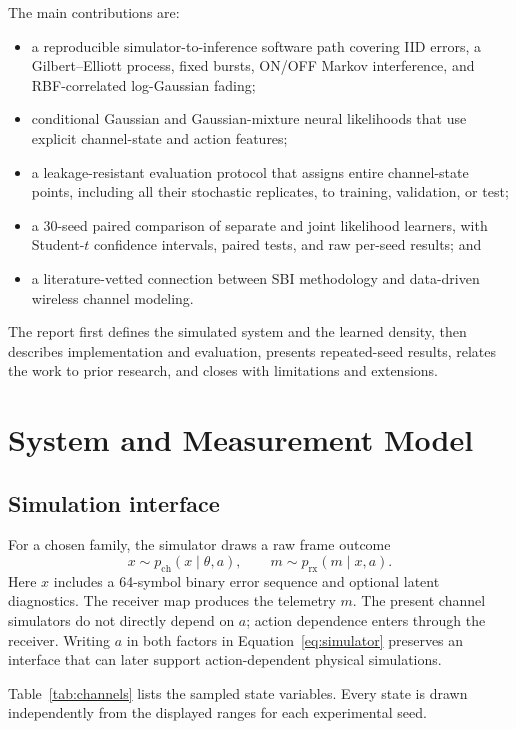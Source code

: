 \documentclass[10pt]{article}
\begin{document}
The main contributions are:
\begin{itemize}
  \item a reproducible simulator-to-inference software path covering IID errors, a Gilbert--Elliott process, fixed bursts, ON/OFF Markov interference, and RBF-correlated log-Gaussian fading;
  \item conditional Gaussian and Gaussian-mixture neural likelihoods that use explicit channel-state and action features;
  \item a leakage-resistant evaluation protocol that assigns entire channel-state points, including all their stochastic replicates, to training, validation, or test;
  \item a 30-seed paired comparison of separate and joint likelihood learners, with Student-$t$ confidence intervals, paired tests, and raw per-seed results; and
  \item a literature-vetted connection between SBI methodology and data-driven wireless channel modeling.
\end{itemize}

The report first defines the simulated system and the learned density, then describes implementation and evaluation, presents repeated-seed results, relates the work to prior research, and closes with limitations and extensions.

\section{System and Measurement Model}

\subsection{Simulation interface}

For a chosen family, the simulator draws a raw frame outcome
\begin{equation}
  x \sim p_{\mathrm{ch}}(x\mid\theta,a), \qquad
  m \sim p_{\mathrm{rx}}(m\mid x,a).
  \label{eq:simulator}
\end{equation}
Here $x$ includes a 64-symbol binary error sequence and optional latent diagnostics. The receiver map produces the telemetry $m$. The present channel simulators do not directly depend on $a$; action dependence enters through the receiver. Writing $a$ in both factors in Equation~\eqref{eq:simulator} preserves an interface that can later support action-dependent physical simulations.

Table~\ref{tab:channels} lists the sampled state variables. Every state is drawn independently from the displayed ranges for each experimental seed.
\end{document}
